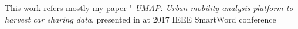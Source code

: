 %

This work refers mostly my paper " \textit{UMAP: Urban mobility analysis platform to harvest car sharing data}, presented in at 2017 IEEE SmartWord conference \cite{ciociolaumap}

